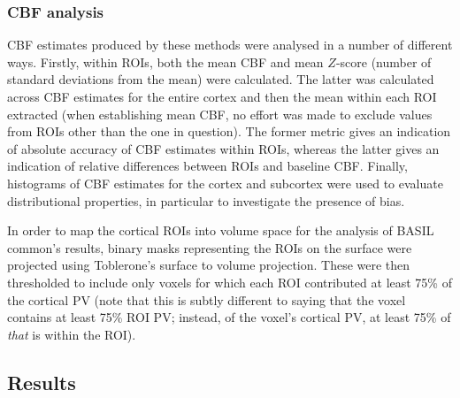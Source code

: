 \documentclass[12pt]{report}
\begin{document}
\subsubsection{CBF analysis} 

CBF estimates produced by these methods were analysed in a number of different ways. Firstly, within ROIs, both the mean CBF and mean $Z$-score (number of standard deviations from the mean) were calculated. The latter was calculated across CBF estimates for the entire cortex and then the mean within each ROI extracted (when establishing mean CBF, no effort was made to exclude values from ROIs other than the one in question). The former metric gives an indication of absolute accuracy of CBF estimates within ROIs, whereas the latter gives an indication of relative differences between ROIs and baseline CBF. Finally, histograms of CBF estimates for the cortex and subcortex were used to evaluate distributional properties, in particular to investigate the presence of bias. 

In order to map the cortical ROIs into volume space for the analysis of BASIL common's results, binary masks representing the ROIs on the surface were projected using Toblerone's surface to volume projection. These were then thresholded to include only voxels for which each ROI contributed at least 75\% of the cortical PV (note that this is subtly different to saying that the voxel contains at least 75\% ROI PV; instead, of the voxel's cortical PV, at least 75\% of \textit{that} is within the ROI).

\subsection{Results}
\end{document}
